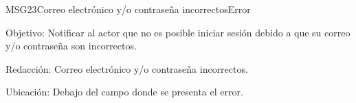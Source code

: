 \begin{mensaje}{MSG23}{Correo electrónico y/o contraseña incorrectos}{Error}
	\item [Objetivo:] Notificar al actor que no es posible iniciar sesión debido a que su correo y/o contraseña son incorrectos.
	\item[Redacción:] Correo electrónico y/o contraseña incorrectos.
	\item [Ubicación:] Debajo del campo donde se presenta el error.
\end{mensaje}